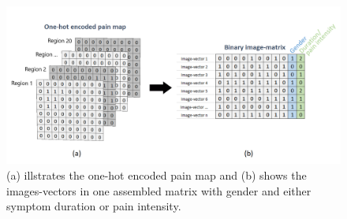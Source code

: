 \begin{figure} [H]
\centering
\includegraphics[width=1\textwidth]{figures/onehotmatrix}
\caption{(a) illstrates the one-hot encoded pain map and (b) shows the images-vectors in one assembled matrix with gender and either symptom duration or pain intensity.}
\label{fig:onehot}
\end{figure}